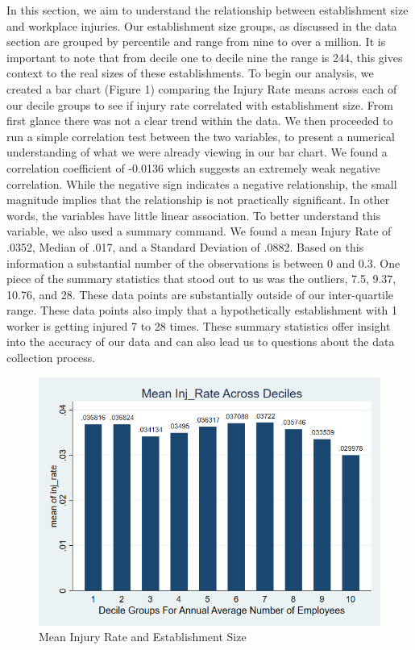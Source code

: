 \documentclass[12pt]{article}
\begin{document}
In this section, we aim to understand the relationship between establishment size and workplace injuries. Our establishment size groups, as discussed in the data section are grouped by percentile and range from nine to over a million. It is important to note that from decile one to decile nine the range is 244, this gives context to the real sizes of these establishments. To begin our analysis, we created a bar chart (Figure 1) comparing the Injury Rate means across each of our decile groups to see if injury rate correlated with establishment size. From first glance there was not a clear trend within the data. We then proceeded to run a simple correlation test between the two variables, to present a numerical understanding of what we were already viewing in our bar chart. We found a correlation coefficient of -0.0136 which suggests an extremely weak negative correlation. While the negative sign indicates a negative relationship, the small magnitude implies that the relationship is not practically significant. In other words, the variables have little linear association. To better understand this variable, we also used a summary command. We found a mean Injury Rate of .0352, Median of .017, and a Standard Deviation of .0882. Based on this information a substantial number of the observations is between 0 and 0.3. One piece of the summary statistics that stood out to us was the outliers, 7.5, 9.37, 10.76, and 28. These data points are substantially outside of our inter-quartile range. These data points also imply that a hypothetically establishment with 1 worker is getting injured 7 to 28 times. These summary statistics offer insight into the accuracy of our data and can also lead us to questions about the data collection process.
\begin{figure}
    \centering
    \includegraphics[width=0.7\linewidth]{Inj_RateDecileBar (3).png}
    \caption{Mean Injury Rate and Establishment Size}
    \label{Figure 1:}
\end{figure}
\end{document}
